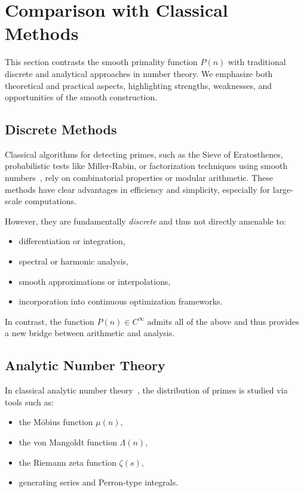 \documentclass[12pt]{article}
\theoremstyle{definition}
\theoremstyle{plain}
\theoremstyle{remark}
\begin{document}
\section{Comparison with Classical Methods}

This section contrasts the smooth primality function \( P(n) \) with traditional discrete and analytical approaches in number theory. We emphasize both theoretical and practical aspects, highlighting strengths, weaknesses, and opportunities of the smooth construction.

\subsection{Discrete Methods}

Classical algorithms for detecting primes, such as the Sieve of Eratosthenes, probabilistic tests like Miller-Rabin, or factorization techniques using smooth numbers~\cite{brent1999some}, rely on combinatorial properties or modular arithmetic. These methods have clear advantages in efficiency and simplicity, especially for large-scale computations.

However, they are fundamentally \emph{discrete} and thus not directly amenable to:
\begin{itemize}
    \item differentiation or integration,
    \item spectral or harmonic analysis,
    \item smooth approximations or interpolations,
    \item incorporation into continuous optimization frameworks.
\end{itemize}

In contrast, the function \( P(n) \in C^\infty \) admits all of the above and thus provides a new bridge between arithmetic and analysis.

\subsection{Analytic Number Theory}

In classical analytic number theory~\cite{montgomery2007multiplicative, titchmarsh1986theory}, the distribution of primes is studied via tools such as:
\begin{itemize}
    \item the Möbius function \( \mu(n) \),
    \item the von Mangoldt function \( \Lambda(n) \),
    \item the Riemann zeta function \( \zeta(s) \),
    \item generating series and Perron-type integrals.
\end{itemize}
\end{document}
